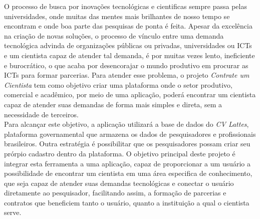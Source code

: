 \begin{resumoutfpr}
    O processo de busca por inovações tecnológicas e cientificas sempre passa pelas universidades, onde muitas das mentes mais brilhantes de nosso tempo se encontram e onde boa parte das pesquisas de ponta é feita. Apesar da excelência na criação de novas soluções, o processo de vínculo entre uma demanda tecnológica advinda de organizações públicas ou privadas, universidades ou ICTs e um cientista capaz de atender tal demanda, é por muitas vezes lento, ineficiente e burocrático, o que acaba por desencorajar o mundo produtivo em procurar as ICTs para formar parcerias. Para atender esse problema, o projeto \emph{Contrate um Cientista} tem como objetivo criar uma plataforma onde o setor produtivo, comercial e acadêmico, por meio de uma aplicação, poderá encontrar um cientista capaz de atender suas demandas de forma mais simples e direta, sem a necessidade de terceiros.
    \\
    Para alcançar este objetivo, a aplicação utilizará a base de dados do \emph{CV Lattes}, plataforma governamental que armazena os dados de pesquisadores e profissionais brasileiros. Outra estratégia é possibilitar que os pesquisadores possam criar seu prórpio cadastro dentro da plataforma. O objetivo principal deste projeto é integrar esta ferramenta a uma aplicação, capaz de proporcionar a um usuário a possibilidade de encontrar um cientista em uma área especifica de conhecimento, que seja capaz de atender suas demandas tecnológicas e conectar o usuário diretamente ao pesquisador, facilitando assim, a formação de parcerias e contratos que beneficiem tanto o usuário, quanto a instituição a qual o cientista serve.
\end{resumoutfpr}
